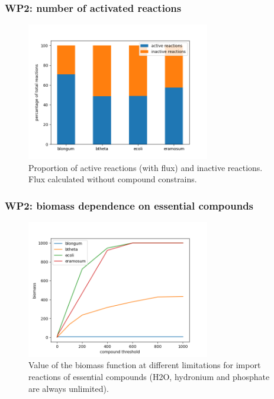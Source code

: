 \documentclass[serif,10pt,aspectratio=169]{beamer}
\begin{document}
\begin{frame}\frametitle{WP2: number of activated reactions}
	\begin{figure}
		\includegraphics[height=6cm]{images/acitive_reaction_proportions_compound_threshold_1000.png}
		\caption{Proportion of active reactions (with flux) and inactive reactions. Flux calculated without compound constrains.}
	\end{figure}
\end{frame}

\begin{frame}\frametitle{WP2: biomass dependence on essential compounds}
	\begin{figure}
		\includegraphics[height=6cm]{images/biomass.png}
		\caption{Value of the biomass function at different limitations for import reactions of essential compounds (H2O, hydronium and phosphate are always unlimited).}
	\end{figure}
\end{frame}
\end{document}
